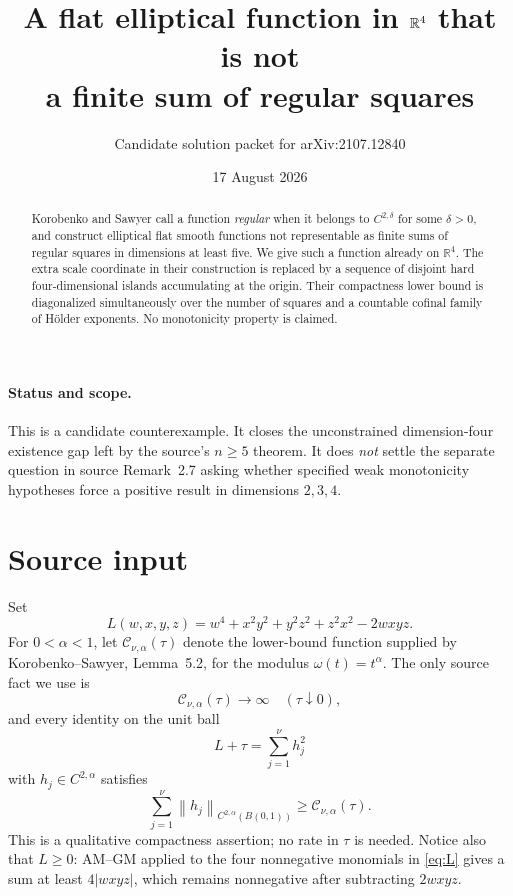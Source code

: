 \documentclass[11pt]{article}
\title{A flat elliptical function in \(\R^4\) that is not\\
a finite sum of regular squares}
\author{Candidate solution packet for arXiv:2107.12840}
\date{17 August 2026}
\newcommand{\R}{\mathbb R}
\newcommand{\norm}[1]{\left\lVert #1\right\rVert}
\begin{document}
\maketitle

\begin{abstract}
Korobenko and Sawyer call a function \emph{regular} when it belongs to
\(C^{2,\delta}\) for some \(\delta>0\), and construct elliptical flat smooth
functions not representable as finite sums of regular squares in dimensions
at least five.  We give such a function already on \(\R^4\).  The extra scale
coordinate in their construction is replaced by a sequence of disjoint hard
four-dimensional islands accumulating at the origin.  Their compactness
lower bound is diagonalized simultaneously over the number of squares and a
countable cofinal family of H\"older exponents.  No monotonicity property is
claimed.
\end{abstract}

\paragraph{Status and scope.}
This is a candidate counterexample.  It closes the unconstrained
dimension-four existence gap left by the source's \(n\geq5\) theorem.  It
does \emph{not} settle the separate question in source Remark~2.7 asking
whether specified weak monotonicity hypotheses force a positive result in
dimensions \(2,3,4\).

\section{Source input}

Set
\begin{equation}\label{eq:L}
 L(w,x,y,z)=w^4+x^2y^2+y^2z^2+z^2x^2-2wxyz.
\end{equation}
For \(0<\alpha<1\), let \(\mathcal C_{\nu,\alpha}(\tau)\) denote the
lower-bound function supplied by Korobenko--Sawyer, Lemma~5.2, for the modulus
\(\omega(t)=t^\alpha\).  The only source fact we use is
\begin{equation}\label{eq:source-hardness}
 \mathcal C_{\nu,\alpha}(\tau)\longrightarrow\infty
 \quad(\tau\downarrow0),
\end{equation}
and every identity on the unit ball
\begin{equation}\label{eq:source-identity}
 L+\tau=\sum_{j=1}^{\nu}h_j^2
\end{equation}
with \(h_j\in C^{2,\alpha}\) satisfies
\begin{equation}\label{eq:source-lower}
 \sum_{j=1}^{\nu}\norm{h_j}_{C^{2,\alpha}(B(0,1))}
 \geq \mathcal C_{\nu,\alpha}(\tau).
\end{equation}
This is a qualitative compactness assertion; no rate in \(\tau\) is needed.
Notice also that \(L\geq0\): AM--GM applied to the four nonnegative monomials
in \eqref{eq:L} gives a sum at least \(4|wxyz|\), which remains nonnegative
after subtracting \(2wxyz\).
\end{document}

